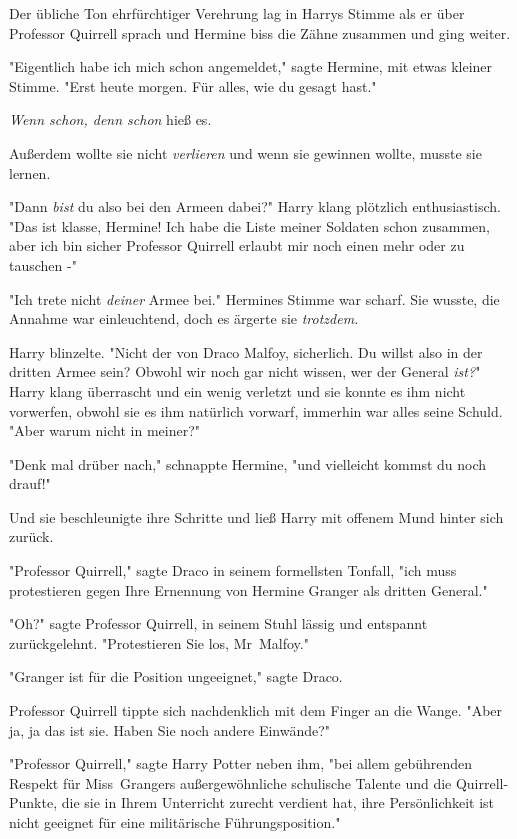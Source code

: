 {Der übliche Ton ehrfürchtiger Verehrung lag in Harrys Stimme als er über Professor Quirrell sprach und Hermine biss die Zähne zusammen und ging weiter.

"Eigentlich habe ich mich schon angemeldet," sagte Hermine, mit etwas kleiner Stimme. "Erst heute morgen. Für alles, wie du gesagt hast."

\emph{Wenn schon, denn schon} hieß es.

Außerdem wollte sie nicht \emph{verlieren} und wenn sie gewinnen wollte, musste sie lernen.

"Dann \emph{bist} du also bei den Armeen dabei?" Harry klang plötzlich enthusiastisch. "Das ist klasse, Hermine! Ich habe die Liste meiner Soldaten schon zusammen, aber ich bin sicher Professor Quirrell erlaubt mir noch einen mehr oder zu tauschen -"

"Ich trete nicht \emph{deiner} Armee bei." Hermines Stimme war scharf. Sie wusste, die Annahme war einleuchtend, doch es ärgerte sie \emph{trotzdem.}

Harry blinzelte. "Nicht der von Draco Malfoy, sicherlich. Du willst also in der dritten Armee sein? Obwohl wir noch gar nicht wissen, wer der General \emph{ist?}" Harry klang überrascht und ein wenig verletzt und sie konnte es ihm nicht vorwerfen, obwohl sie es ihm natürlich vorwarf, immerhin war alles seine Schuld. "Aber warum nicht in meiner?"

"Denk mal drüber nach," schnappte Hermine, "und vielleicht kommst du noch drauf!"

Und sie beschleunigte ihre Schritte und ließ Harry mit offenem Mund hinter sich zurück.

\later

"Professor Quirrell," sagte Draco in seinem formellsten Tonfall, "ich muss protestieren gegen Ihre Ernennung von Hermine Granger als dritten General."

"Oh?" sagte Professor Quirrell, in seinem Stuhl lässig und entspannt zurückgelehnt. "Protestieren Sie los, Mr~Malfoy."

"Granger ist für die Position ungeeignet," sagte Draco.

Professor Quirrell tippte sich nachdenklich mit dem Finger an die Wange. "Aber ja, ja das ist sie. Haben Sie noch andere Einwände?"

"Professor Quirrell," sagte Harry Potter neben ihm, "bei allem gebührenden Respekt für Miss~Grangers außergewöhnliche schulische Talente und die Quirrell-Punkte, die sie in Ihrem Unterricht zurecht verdient hat, ihre Persönlichkeit ist nicht geeignet für eine militärische Führungsposition."

}
